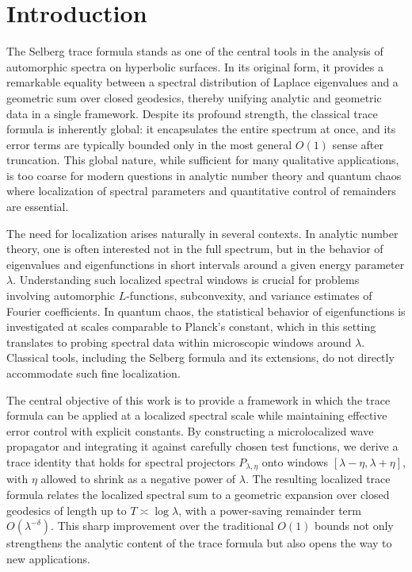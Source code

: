 
\section{Introduction}

The Selberg trace formula stands as one of the central tools in the analysis of
automorphic spectra on hyperbolic surfaces. In its original form, it provides a
remarkable equality between a spectral distribution of Laplace eigenvalues and
a geometric sum over closed geodesics, thereby unifying analytic and geometric
data in a single framework. Despite its profound strength, the classical trace
formula is inherently global: it encapsulates the entire spectrum at once, and
its error terms are typically bounded only in the most general $O(1)$ sense
after truncation. This global nature, while sufficient for many qualitative
applications, is too coarse for modern questions in analytic number theory and
quantum chaos where localization of spectral parameters and quantitative
control of remainders are essential.

The need for localization arises naturally in several contexts. In analytic
number theory, one is often interested not in the full spectrum, but in the
behavior of eigenvalues and eigenfunctions in short intervals around a given
energy parameter $\lambda$. Understanding such localized spectral windows is
crucial for problems involving automorphic $L$-functions, subconvexity, and
variance estimates of Fourier coefficients. In quantum chaos, the statistical
behavior of eigenfunctions is investigated at scales comparable to Planck’s
constant, which in this setting translates to probing spectral data within
microscopic windows around $\lambda$. Classical tools, including the Selberg
formula and its extensions, do not directly accommodate such fine localization.

The central objective of this work is to provide a framework in which the trace
formula can be applied at a localized spectral scale while maintaining effective
error control with explicit constants. By constructing a microlocalized wave
propagator and integrating it against carefully chosen test functions, we
derive a trace identity that holds for spectral projectors $P_{\lambda,\eta}$
onto windows $[\lambda-\eta,\lambda+\eta]$, with $\eta$ allowed to shrink as a
negative power of $\lambda$. The resulting localized trace formula relates the
localized spectral sum to a geometric expansion over closed geodesics of length
up to $T \asymp \log \lambda$, with a power-saving remainder term
$O(\lambda^{-\delta})$. This sharp improvement over the traditional $O(1)$
bounds not only strengthens the analytic content of the trace formula but also
opens the way to new applications.

